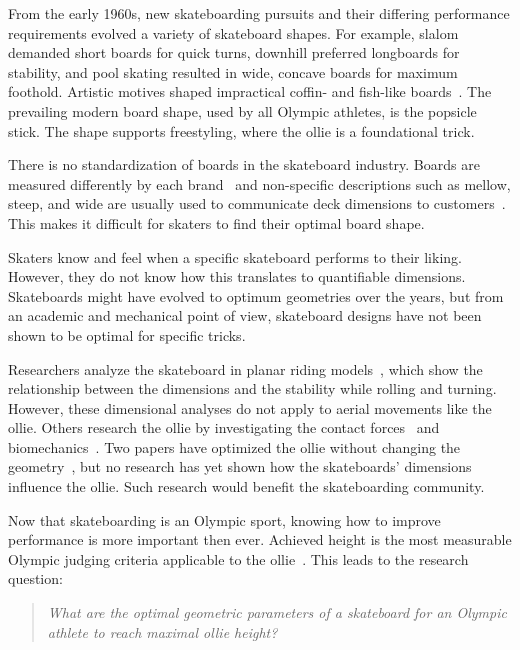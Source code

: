 \documentclass[default,iicol]{sn-jnl}
\begin{document}
From the early 1960s, new skateboarding pursuits and their differing performance requirements evolved a variety of skateboard shapes.
For example, slalom demanded short boards for quick turns, downhill preferred longboards for stability, and pool skating resulted in wide, concave boards for maximum foothold. 
Artistic motives shaped impractical coffin- and
fish-like boards~\cite{prentiss_get_2011}.
The prevailing modern board shape, used by all Olympic athletes, is the popsicle stick.
The shape supports freestyling, where the ollie is a foundational trick.

There is no standardization of boards in the skateboard industry.
Boards are measured differently by each brand~\cite{johnny_skateboarding_2013} and non-specific descriptions such as mellow, steep, and wide are usually used to communicate deck dimensions to customers~\cite{berger_handmade_2021}.
This makes it difficult for skaters to find their optimal board shape.

Skaters know and feel when a specific skateboard performs to their liking.
However, they do not know how this translates to quantifiable dimensions.
Skateboards might have evolved to optimum geometries over the years, but from an academic and mechanical point of view, skateboard designs have not been shown to be optimal for specific tricks.

Researchers analyze the skateboard in planar riding models~\cite{hubbard_lateral_1979,hubbard_human_1980,kremnev_nonlinear_2010,ispolov_skateboard_1996,rosatello_skateboard_2015,varszegi_stability_2017,varszegi_stabilizing_2016,varszegi_downhill_2016,varszegi_balancing_2014,kuleshov_mathematical_2007,kuleshov_various_2010}, which show the relationship between the dimensions and the stability while rolling and turning. 
However, these dimensional analyses do not apply to aerial movements like the ollie.
Others research the ollie by investigating the contact forces~\cite{anderson_ollie_2020,shield_contact-implicit_2022} and biomechanics~\cite{frederick_biomechanics_2006,vorlicek_analysis_2015,wood_3d_2020,nakashima_simulation_2021,nevitt_ground_2006,candotti_lower_2012,dias_using_2016,anderson_ollie_2020,bridgman_human_1992,ou_postural_2021}.
Two papers have optimized the ollie without changing the geometry~\cite{anderson_ollie_2020,shield_contact-implicit_2022}, but no research has yet shown how the skateboards' dimensions influence the ollie.
Such research would benefit the skateboarding community.

Now that skateboarding is an Olympic sport, knowing how to improve performance is more important then ever.
Achieved height is the most measurable Olympic judging criteria applicable to the ollie~\cite{world_skate_skateboarding_2021}.
This leads to the research question:
\begin{quote}
\textit{
    What are the optimal geometric parameters of a skateboard for an Olympic athlete to reach maximal ollie height?}
\end{quote}
\end{document}
